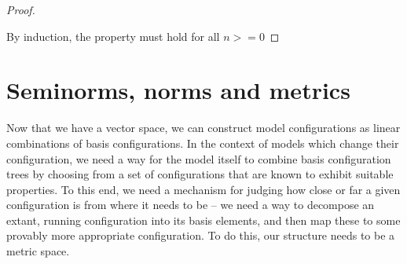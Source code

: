 \begin{proposition}
\begin{proof}
\begin{description}
      



    \end{description}
    By induction, the property must hold for all \(n >= 0\)
  \end{proof}
\end{proposition}


\section{Seminorms, norms and metrics} %

Now that we have a vector space, we can construct model configurations
as linear combinations of basis configurations. In the context of models
which change their configuration, we need a way for the model itself
to combine basis configuration trees by choosing from a set of
configurations that are known to exhibit suitable properties.  To this
end, we need a mechanism for judging how close or far a given
configuration is from where it needs to be -- we need a way to
decompose an extant, running configuration into its basis elements,
and then map these to some provably more appropriate configuration.
To do this, our structure needs to be a metric space.

